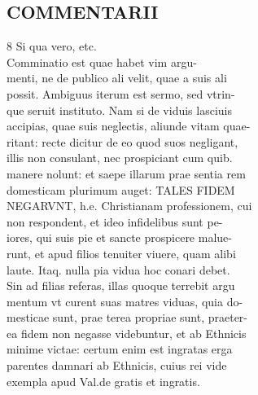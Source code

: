 \documentclass{article}
\begin{document}
\begin{pages}
\section*{COMMENTARII \\
                }8 Si qua vero, etc. \\
                Comminatio est quae habet vim argu- \\
                menti, ne de publico ali velit, quae a suis ali \\
                possit. Ambiguus iterum est sermo, sed vtrin- \\
                que seruit instituto. Nam si de viduis lasciuis \\
                accipias, quae suis neglectis, aliunde vitam quae- \\
                ritant: recte dicitur de eo quod suos negligant, \\
                illis non consulant, nec prospiciant cum quib. \\
                manere nolunt: et saepe illarum prae sentia rem \\
                domesticam plurimum auget: TALES FIDEM \\
                NEGARVNT, h.e. Christianam professionem, cui \\
                non respondent, et ideo infidelibus sunt pe- \\
                iores, qui suis pie et sancte prospicere malue- \\
                runt, et apud filios tenuiter viuere, quam alibi \\
                laute. Itaq. nulla pia vidua hoc conari debet. \\
                Sin ad filias referas, illas quoque terrebit argu \\
                mentum vt curent suas matres viduas, quia do- \\
                mesticae sunt, prae terea propriae sunt, praeter- \\
                ea fidem non negasse videbuntur, et ab Ethnicis \\
                minime victae: certum enim est ingratas erga \\
                parentes damnari ab Ethnicis, cuius rei vide \\
                exempla apud Val.de gratis et ingratis. \\

\end{pages}
\end{document}
